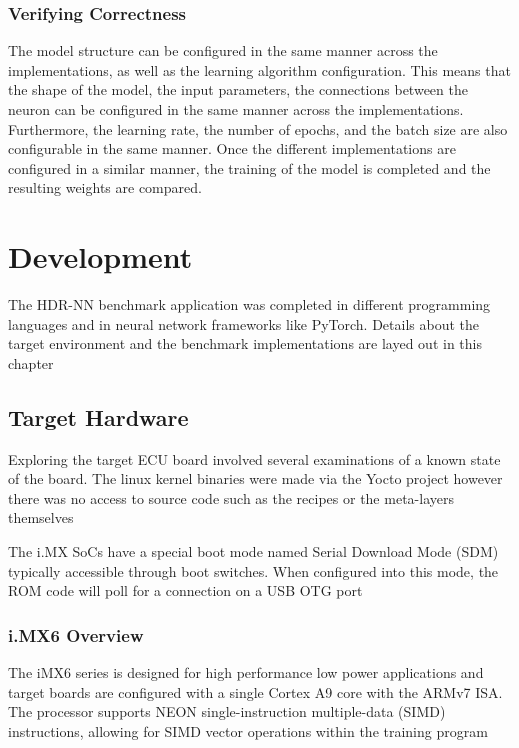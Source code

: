 \subsection[Verifying Correctness]{Verifying Correctness}

The model structure can be configured in the same manner across the implementations, as well as the learning algorithm configuration. This means that the shape of the model, the input parameters, the connections between the neuron can be configured in the same manner across the implementations. Furthermore, the learning rate, the number of epochs, and the batch size are also configurable in the same manner. Once the different implementations are configured in a similar manner, the training of the model is completed and the resulting weights are compared.

\chapter{Development}

The HDR-NN benchmark application was completed in different programming languages and in neural network frameworks like PyTorch. Details about the target environment and the benchmark implementations are layed out in this chapter

\section[iMX6 Custom Board Target]{Target Hardware}

Exploring the target ECU board involved several examinations of a known state of the board. The linux kernel binaries were made via the Yocto project however there was no access to source code such as the recipes or the meta-layers themselves

The i.MX SoCs have a special boot mode named Serial Download Mode (SDM) typically accessible through boot switches. When configured into this mode, the ROM code will poll for a connection on a USB OTG port

\subsection[ECU / iMX6 Evaluation Board Overview]{i.MX6 Overview}

The iMX6 series is designed for high performance low power applications and target boards are configured with a single Cortex A9 core with the ARMv7 ISA. The processor supports NEON single-instruction multiple-data (SIMD) instructions, allowing for SIMD vector operations within the training program

